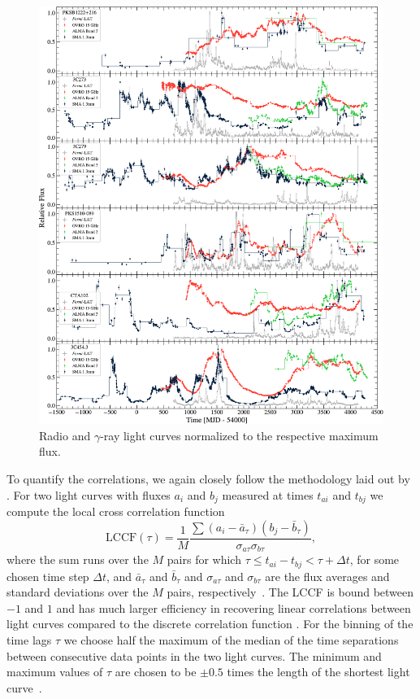 \documentclass[twocolumn,linenumbers]{aastex62}
\newcommand{\gray}{$\gamma$-ray\xspace}
\begin{document}
\begin{figure}
    \centering
    \includegraphics[width = .8\linewidth]{figures/lc_gamma_radio_tsmin9.pdf}
    \caption{Radio and \gray light curves normalized to the respective maximum flux.}
    \label{fig:lc-radio}
\end{figure}

To quantify the correlations, we again closely follow the methodology laid out by \citet{2014MNRAS.445..437M}. 
For two light curves with fluxes $a_i$ and $b_j$ 
measured at times $t_{ai}$ and $t_{bj}$ we compute the local cross correlation function
\begin{equation}
\mathrm{LCCF}(\tau) = \frac{1}{M}\frac{\sum(a_i - \bar{a}_\tau)(b_j - \bar{b}_\tau)}{\sigma_{a\tau}\sigma_{b\tau}},
\end{equation}
where the sum runs over the $M$ pairs for which $\tau \leqslant t_{ai} - t_{bj} < \tau + \Delta t$, for some chosen time step $\Delta t$, and $\bar{a}_\tau$ and $\bar{b}_\tau$ and $\sigma_{a\tau}$ and $\sigma_{b\tau}$ are the flux averages and standard deviations over the $M$ pairs, respectively~\citep{1999PASP..111.1347W}. 
The LCCF is bound between $-1$ and $1$ and has much larger efficiency in recovering linear correlations between light curves compared to the discrete correlation function \citep{2014MNRAS.445..437M}.
For the binning of the time lags $\tau$ we choose half the maximum of the median of the time separations between consecutive data points in the two light curves.
The minimum and maximum values of $\tau$ are chosen to be $\pm0.5$ times the length of the shortest light curve~\citep{2014MNRAS.445..428M}.
\end{document}
